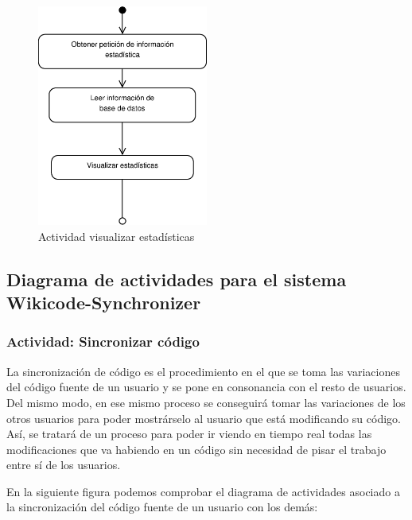 \begin{figure}[h]
	\centering
	\includegraphics[width=0.5\textwidth]{./img/DiagramaA9.eps}
	\caption{Actividad visualizar estadísticas}
\end{figure}

\newpage
\subsection{Diagrama de actividades para el sistema Wikicode-Synchronizer}
\subsubsection{Actividad: Sincronizar código}

La sincronización de código es el procedimiento en el que se toma las variaciones del código fuente de un usuario y se pone en consonancia con el resto de usuarios. Del mismo modo, en ese mismo proceso se conseguirá tomar las variaciones de los otros usuarios para poder mostrárselo al usuario que está modificando su código. Así, se tratará de un proceso para poder ir viendo en tiempo real todas las modificaciones que va habiendo en un código sin necesidad de pisar el trabajo entre sí de los usuarios.

En la siguiente figura podemos comprobar el diagrama de actividades asociado a la sincronización del código fuente de un usuario con los demás:

